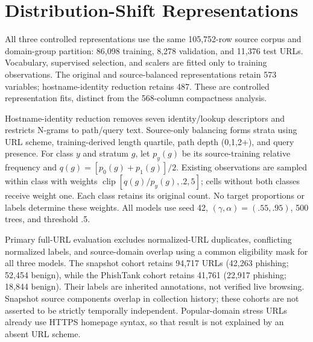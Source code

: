\documentclass[10pt]{article}
\newenvironment{bluechange}{\color{black}}{}
\begin{document}
\section{Distribution-Shift Representations}
\begin{bluechange}
All three controlled representations use the same 105,752-row source corpus and domain-group partition: 86,098 training, 8,278 validation, and 11,376 test URLs. Vocabulary, supervised selection, and scalers are fitted only to training observations. The original and source-balanced representations retain 573 variables; hostname-identity reduction retains 487. These are controlled representation fits, distinct from the 568-column compactness analysis.

Hostname-identity reduction removes seven identity/lookup descriptors and restricts N-grams to path/query text. Source-only balancing forms strata using URL scheme, training-derived length quartile, path depth (0,1,2+), and query presence. For class $y$ and stratum $g$, let $p_y(g)$ be its source-training relative frequency and $q(g)=[p_0(g)+p_1(g)]/2$. Existing observations are sampled within class with weights $\operatorname{clip}[q(g)/p_y(g),.2,5]$; cells without both classes receive weight one. Each class retains its original count. No target proportions or labels determine these weights. All models use seed 42, $(\gamma,\alpha)=(.55,.95)$, 500 trees, and threshold .5.

Primary full-URL evaluation excludes normalized-URL duplicates, conflicting normalized labels, and source-domain overlap using a common eligibility mask for all three models. The snapshot cohort retains 94,717 URLs (42,263 phishing; 52,454 benign), while the PhishTank cohort retains 41,761 (22,917 phishing; 18,844 benign). Their labels are inherited annotations, not verified live browsing. Snapshot source components overlap in collection history; these cohorts are not asserted to be strictly temporally independent. Popular-domain stress URLs already use HTTPS homepage syntax, so that result is not explained by an absent URL scheme.
\end{bluechange}
\end{document}
